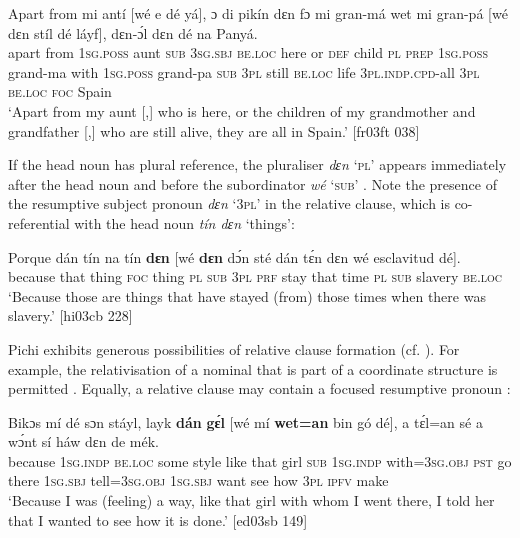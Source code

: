 \ea%
    \label{ex:key:1424}
    \gll Apart  from  mi    antí    [wé  e    dé    yá],    ɔ  di  pikín
dɛn  fɔ  mi    gran-má    wet    mi    gran-pá    [wé  dɛn  stíl  dé
láyf],  dɛn-ɔ́l      dɛn  dé    na  Panyá.\\
apart  from  \textsc{1sg.poss}  aunt     \textsc{sub}  \textsc{3sg.sbj}  \textsc{be.loc}  here    or  \textsc{def}  child
\textsc{pl}  \textsc{prep}  \textsc{1sg.poss}  grand-ma  with    \textsc{1sg.poss}  grand-pa     \textsc{sub}  \textsc{3pl}  still  \textsc{be.loc}
life     \textsc{3pl.indp.cpd-}all  \textsc{3pl}  \textsc{be.loc}  \textsc{foc}  Spain\\

\glt ‘Apart from my aunt [,] who is here, or the children of my grandmother and grandfather
[,] who are still alive, they are all in Spain.’ [fr03ft 038]
\z

If the head noun has plural reference, the pluraliser \textit{dɛn} ‘\textsc{pl}’ appears immediately after the head noun and before the subordinator \textit{wé} ‘\textsc{sub}’ . Note the presence of the resumptive subject pronoun \textit{dɛn} ‘\textsc{3pl}’ in the relative clause, which is co-referential with the head noun \textit{tín dɛn} ‘things’: 


\ea%
    \label{ex:key:1425}
    \gll Porque  dán    tín    na  tín    \textbf{dɛn}    [wé  \textbf{dɛn}  dɔ́n  sté  
dán  tɛ́n    dɛn  wé  esclavitud  dé].\\
because  that    thing  \textsc{foc}  thing  \textsc{pl}     \textsc{sub}  \textsc{3pl}  \textsc{prf}  stay  
that  time    \textsc{pl}  \textsc{sub}  slavery    \textsc{be.loc}\\
\glt ‘Because those are things that have stayed (from) those times when there
was slavery.’ [hi03cb 228]
\z

Pichi exhibits generous possibilities of relative clause formation (cf. \citealt[148]{Keenan1985}). For example, the relativisation of a nominal that is part of a coordinate structure is permitted . Equally, a relative clause may contain a focused resumptive pronoun :


\ea%
    \label{ex:key:1426}
    \gll Bikɔs  mí    dé    sɔn    stáyl,  layk  \textbf{dán}  \textbf{gɛ́l}  [wé  mí    \textbf{wet=an}
bin  gó  dé],    a    tɛ́l=an  sé  a    wɔ́nt  sí  háw  dɛn  de  mék.\\
because  \textsc{1sg.indp}  \textsc{be.loc}  some  style  like  that  girl   \textsc{sub}  \textsc{1sg.indp}  with\textsc{=3sg.obj}
\textsc{pst}  go  there  \textsc{1sg.sbj}  tell=\textsc{3sg.obj}  {} \textsc{1sg.sbj}  want  see  how  \textsc{3pl}  \textsc{ipfv}  make\\
\glt ‘Because I was (feeling) a way, like that girl with whom I went there, I told her that
I wanted to see how it is done.’ [ed03sb 149]
\z


